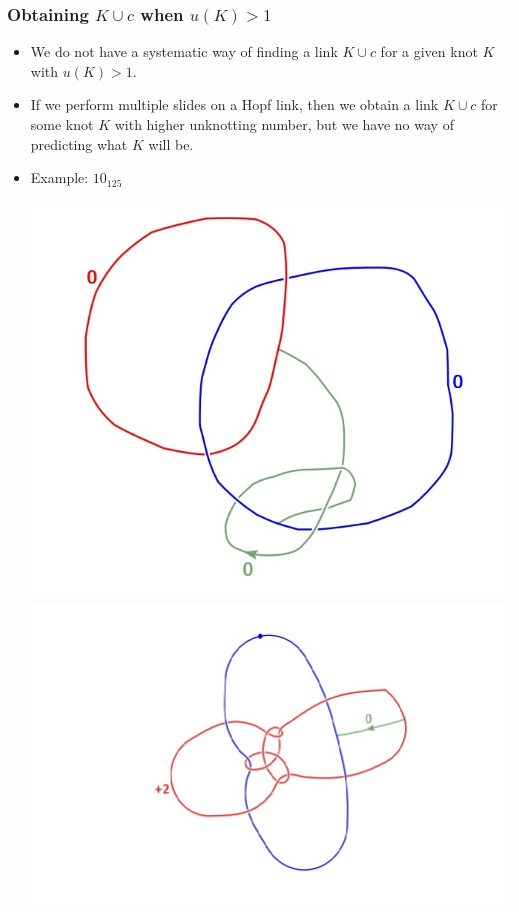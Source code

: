 \documentclass{beamer}
\theoremstyle{ex}
\theoremstyle{rem}
\begin{document}
	\begin{frame}
		\frametitle{Obtaining $K\cup c$ when $u(K)>1$}
		
		\begin{itemize}
			\item We do not have a systematic way of finding a link $K\cup c$ for a given knot $K$ with $u(K)>1$.
			
			\item If we perform multiple slides on a Hopf link, then we obtain a link $K\cup c$ for some knot $K$ with higher unknotting number, but we have no way of predicting what $K$ will be.
			
			\item Example: $10_{125}$
			
			\begin{center}
				\includegraphics[scale=0.25]{10_125_1}
				\includegraphics[scale=0.25]{10_125_2}

\end{center}
\end{itemize}
\end{frame}
\end{document}
